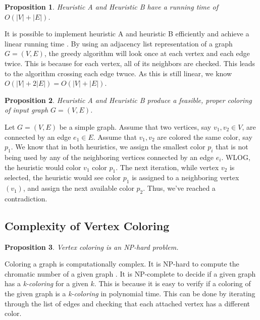 \documentclass{article}
\newtheorem{prop}{Proposition}
\begin{document}
\newpage

\begin{prop}
Heuristic A and Heuristic B have a running time of $O(|V| + |E|)$.
\end{prop}

It is possible to implement heuristic A and heuristic B efficiently and achieve a linear running time \cite{kubale}. By using an adjacency list representation of a graph \(G = (V, E)\), the greedy algorithm will look once at each vertex and each edge twice. This is because for each vertex, all of its neighbors are checked. This leads to the algorithm crossing each edge twuce. As this is still linear, we know \(O(|V| + 2|E|) = O(|V| + |E|)\).

\begin{prop}
Heuristic A and Heuristic B produce a feasible, proper coloring of input graph \(G = (V, E)\).
\end{prop}

Let \(G = (V, E)\) be a simple graph. Assume that two vertices, say \(v_1, v_2 \in V\), are connected by an edge \(e_1 \in E\). Assume that \(v_1, v_2\) are colored the same color, say \(p_1\). We know that in both heuristics, we assign the smallest color \(p_i\) that is not being used by any of the neighboring vertices connected by an edge \(e_i\). WLOG, the heuristic would color \(v_1\) color \(p_1\). The next iteration, while vertex \(v_2\) is selected, the heuristic would see color \(p_1\) is assigned to a neighboring vertex \((v_1)\), and assign the next available color \(p_2\). Thus, we've reached a contradiction.

\subsection*{Complexity of Vertex Coloring}
\begin{prop}
Vertex coloring is an NP-hard problem.
\end{prop}

Coloring a graph is computationally complex. It is NP-hard to compute the chromatic number of a given graph \cite{garey}. It is NP-complete to decide if a given graph has a \emph{k-coloring} for a given \(k\). This is because it is easy to verify if a coloring of the given graph is a \emph{k-coloring} in polynomial time. This can be done by iterating through the list of edges and checking that each attached vertex has a different color.\newline
\end{document}
